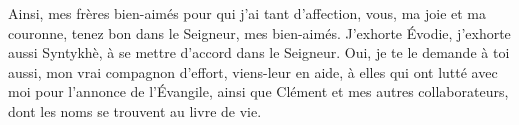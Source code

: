 Ainsi, mes frères bien-aimés pour qui j’ai tant d’affection, vous, ma joie et ma couronne,
	tenez bon dans le Seigneur, mes bien-aimés.
J’exhorte Évodie, j’exhorte aussi Syntykhè, à se mettre d’accord dans le Seigneur.
Oui, je te le demande à toi aussi, mon vrai compagnon d’effort,
	viens-leur en aide, à elles qui ont lutté avec moi pour l’annonce de l’Évangile,
	ainsi que Clément et mes autres collaborateurs,
	dont les noms se trouvent au livre de vie.
